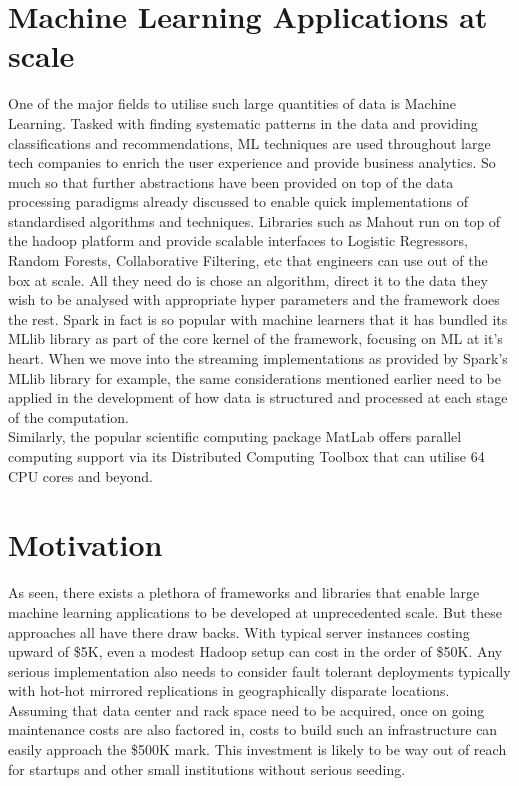 \documentclass[a4paper,11pt]{scrreprt}
\begin{document}
\section{Machine Learning Applications at scale}
One of the major fields to utilise such large quantities of data is Machine Learning. Tasked with finding systematic patterns in the data and providing classifications and recommendations, ML techniques are used throughout large tech companies to enrich the user experience and provide business analytics. So much so that further abstractions have been provided on top of the data processing paradigms already discussed to enable quick implementations of standardised algorithms and techniques. Libraries such as Mahout\cite{mahout-site} run on top of the hadoop platform and provide scalable interfaces to Logistic Regressors, Random Forests, Collaborative Filtering, etc that engineers can use out of the box at scale. All they need do is chose an algorithm, direct it to the data they wish to be analysed with appropriate hyper parameters and the framework does the rest. Spark in fact is so popular with machine learners that it has bundled its MLlib library as part of the core kernel of the framework, focusing on ML at it's heart. When we move into the streaming implementations as provided by Spark's MLlib library for example, the same considerations mentioned earlier need to be applied in the development of how data is structured and processed at each stage of the computation.\\

Similarly, the popular scientific computing package MatLab offers parallel computing support via its Distributed Computing Toolbox that can utilise 64 CPU cores and beyond.

\section{Motivation}
As seen, there exists a plethora of frameworks and libraries that enable large machine learning applications to be developed at unprecedented scale. But these approaches all have there draw backs. With typical server instances costing upward of \$5K, even a modest Hadoop setup can cost in the order of \$50K. Any serious implementation also needs to consider fault tolerant deployments typically with hot-hot mirrored replications in geographically disparate locations. Assuming that data center and rack space need to be acquired, once on going maintenance costs are also factored in, costs to build such an infrastructure can easily approach the \$500K mark. This investment is likely to be way out of reach for startups and other small institutions without serious seeding.
\end{document}
